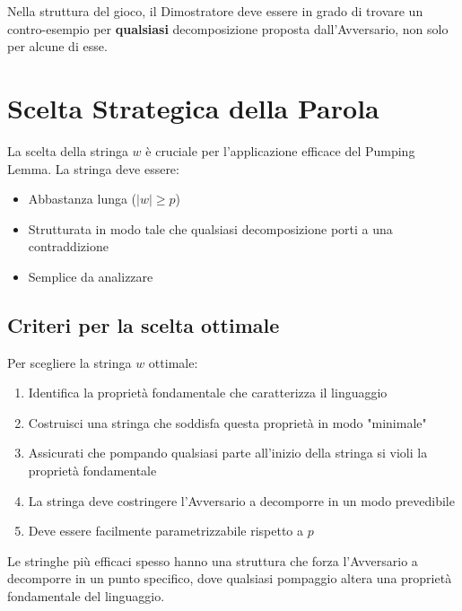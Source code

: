 \documentclass[12pt,a4paper]{article}
\begin{document}
\begin{suggerimento}
Nella struttura del gioco, il Dimostratore deve essere in grado di trovare un contro-esempio per \textbf{qualsiasi} decomposizione proposta dall'Avversario, non solo per alcune di esse.
\end{suggerimento}

\section{Scelta Strategica della Parola}

La scelta della stringa $w$ è cruciale per l'applicazione efficace del Pumping Lemma. La stringa deve essere:
\begin{itemize}
    \item Abbastanza lunga ($|w| \geq p$)
    \item Strutturata in modo tale che qualsiasi decomposizione porti a una contraddizione
    \item Semplice da analizzare
\end{itemize}

\subsection{Criteri per la scelta ottimale}

\begin{risoluzione}
Per scegliere la stringa $w$ ottimale:
\begin{enumerate}
    \item Identifica la proprietà fondamentale che caratterizza il linguaggio
    \item Costruisci una stringa che soddisfa questa proprietà in modo "minimale"
    \item Assicurati che pompando qualsiasi parte all'inizio della stringa si violi la proprietà fondamentale
    \item La stringa deve costringere l'Avversario a decomporre in un modo prevedibile
    \item Deve essere facilmente parametrizzabile rispetto a $p$
\end{enumerate}
\end{risoluzione}

\begin{concettochiave}
Le stringhe più efficaci spesso hanno una struttura che forza l'Avversario a decomporre in un punto specifico, dove qualsiasi pompaggio altera una proprietà fondamentale del linguaggio.
\end{concettochiave}
\end{document}
